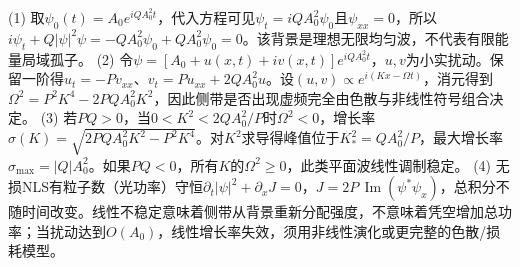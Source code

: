 (1) 取\(\psi_0(t)=A_0e^{iQA_0^2t}\)，代入方程可见\(\psi_t=iQA_0^2\psi_0\)且\(\psi_{xx}=0\)，所以\(i\psi_t+Q|\psi|^2\psi=-QA_0^2\psi_0+QA_0^2\psi_0=0\)。该背景是理想无限均匀波，不代表有限能量局域孤子。
(2) 令\(\psi=[A_0+u(x,t)+iv(x,t)]e^{iQA_0^2t}\)，\(u,v\)为小实扰动。保留一阶得\(u_t=-P v_{xx}\)、\(v_t=P u_{xx}+2QA_0^2u\)。设\((u,v)\propto e^{i(Kx-\Omega t)}\)，消元得到\(\Omega^2=P^2K^4-2PQA_0^2K^2\)，因此侧带是否出现虚频完全由色散与非线性符号组合决定。
(3) 若\(PQ>0\)，当\(0<K^2<2QA_0^2/P\)时\(\Omega^2<0\)，增长率\(\sigma(K)=\sqrt{2PQA_0^2K^2-P^2K^4}\)。对\(K^2\)求导得峰值位于\(K_*^2=QA_0^2/P\)，最大增长率\(\sigma_{\max}=|Q|A_0^2\)。如果\(PQ<0\)，所有\(K\)的\(\Omega^2\ge0\)，此类平面波线性调制稳定。
(4) 无损NLS有粒子数（光功率）守恒\(\partial_t|\psi|^2+\partial_x J=0\)，\(J=2P\,\operatorname{Im}(\psi^*\psi_x)\)，总积分不随时间改变。线性不稳定意味着侧带从背景重新分配强度，不意味着凭空增加总功率；当扰动达到\(O(A_0)\)，线性增长率失效，须用非线性演化或更完整的色散/损耗模型。

